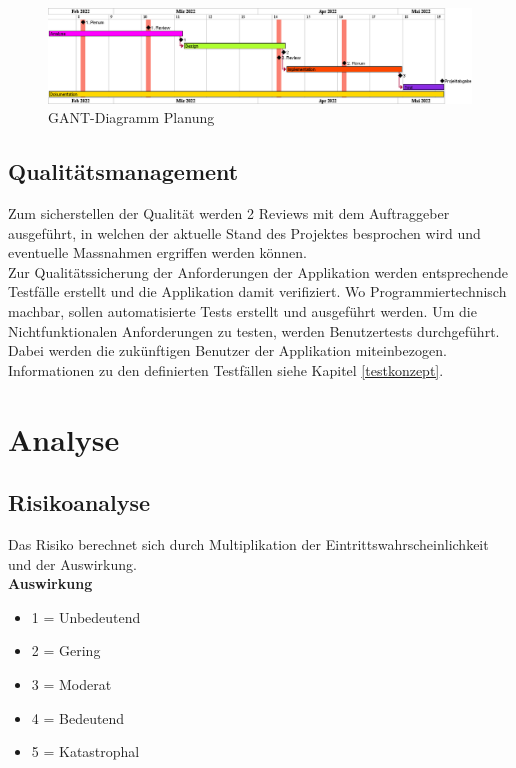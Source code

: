 \vspace*{3mm}

\begin{figure}[htp]
    \begin{center}
        \includegraphics[width=1\linewidth]{content/diagrams/out/planning/planning.png}
        \caption{GANT-Diagramm Planung}
      \end{center}
\end{figure}
\newpage

\subsection{Qualitätsmanagement}
Zum sicherstellen der Qualität werden 2 Reviews mit dem Auftraggeber ausgeführt, in welchen der aktuelle Stand des Projektes besprochen wird und eventuelle Massnahmen ergriffen werden können. \\
Zur Qualitätssicherung der Anforderungen der Applikation werden entsprechende Testfälle erstellt und die Applikation damit verifiziert. Wo Programmiertechnisch machbar, sollen automatisierte Tests erstellt und ausgeführt werden. Um die Nichtfunktionalen Anforderungen zu testen, werden Benutzertests durchgeführt. Dabei werden die zukünftigen Benutzer der Applikation miteinbezogen. Informationen zu den definierten Testfällen siehe Kapitel \ref{testkonzept}.

\newpage
\section{Analyse}
\subsection{Risikoanalyse}
Das Risiko berechnet sich durch Multiplikation der Eintrittswahrscheinlichkeit und der Auswirkung. \\
\textbf{Auswirkung}
\begin{itemize}
  \item 1 = Unbedeutend
  \item 2 = Gering
  \item 3 = Moderat
  \item 4 = Bedeutend
  \item 5 = Katastrophal
\end{itemize}

